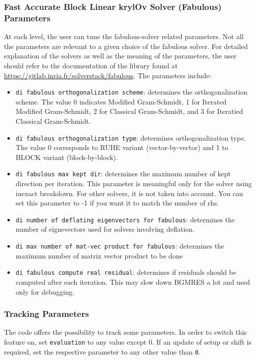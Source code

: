 \documentclass[a4paper,12pt]{scrartcl}
\begin{document}
\subsubsection{Fast Accurate Block Linear krylOv Solver (Fabulous) Parameters}
At each level, the user can tune the fabulous-solver related parameters.  Not all the parameters are relevant to a given choice of the fabulous solver.  For detailed explanation of the solvers as well as the meaning of the parameters, the user should refer to the documentation of the library found at \url{https://gitlab.inria.fr/solverstack/fabulous}.  The parameters include:
\begin{itemize}
\item \texttt{di fabulous orthogonalization scheme}: determines the orthogonalization scheme.  The value 0 indicates Modified Gram-Schmidt, 1 for Iterated Modified Gram-Schmidt, 2 for  Classical Gram-Schmidt, and 3 for Iteratied Classical Gram-Schmidt.
\item \texttt{di fabulous orthogonalization type}: determines orthogonalization type.  The value 0 corresponds to RUHE variant (vector-by-vector) and 1 to BLOCK variant (block-by-block).
\item \texttt{di fabulous max kept dir}:  determines the maximum number of kept direction per iteration.  This parameter is meaningful only for the solver using inexact breakdown.   For other solvers, it is not taken into account. You can set this parameter to -1 if you want it to match the number of rhs.
\item \texttt{di number of deflating eigenvectors for fabulous}: determines the number of eignevectors used for solvers involving deflation.
\item \texttt{di max number of mat-vec product for fabulous}: determines the maximum number of matrix vector product to be done
\item \texttt{di fabulous compute real residual}: determines if residuals should be computed after each iteration.  This may slow down BGMRES a lot and used only for debugging.
\end{itemize}

\subsubsection{Tracking Parameters}
The code offers the possibility to track some parameters. In order to switch this feature on, set \texttt{evaluation} to any value except 0. If an update of setup or shift is required, set the respective parameter to any other value than \texttt{0}.
\end{document}
